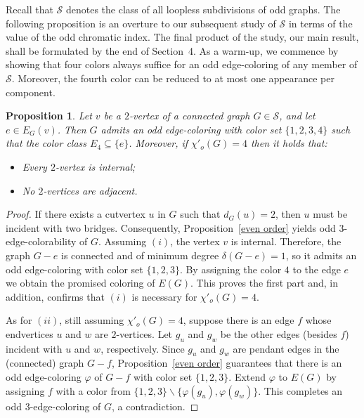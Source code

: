 \documentclass[a4paper,12pt]{article}
\newtheorem{proposition}[theorem]{Proposition}
\numberwithin{equation}{section}
\begin{document}
Recall that $\mathcal{S}$ denotes the class of all loopless subdivisions of odd graphs. The following proposition is an overture to our subsequent study of $\mathcal{S}$ in terms of the value of the odd chromatic index. The final product of the study, our main result, shall be formulated by the end of Section~4. As a warm-up, we commence by showing that four colors always suffice for an odd edge-coloring of any member of $\mathcal{S}$. Moreover, the fourth color can be reduced to at most one appearance per component.
\begin{proposition}
    \label{4-edge-colorability}
Let $v$ be a $2$-vertex of a connected graph $G\in \mathcal{S}$, and let $e\in E_G(v)$. Then $G$ admits an odd edge-coloring with color set $\{1,2,3,4\}$ such that the color class $E_4\subseteq \{e\}$. Moreover, if $\chi'_o(G)=4$ then it holds that:
 \begin{itemize}
 \item [$(i)$] Every $2$-vertex is internal;
 \item [$(ii)$] No $2$-vertices are adjacent.
 \end{itemize}
\end{proposition}
\begin{proof}
If there exists a cutvertex $u$ in $G$ such that $d_G(u)=2$, then $u$ must be incident with two bridges. Consequently, Proposition~\ref{even order} yields odd $3$-edge-colorability of $G$. Assuming $(i)$, the vertex $v$ is internal. Therefore, the graph $G-e$ is connected and of minimum degree $\delta(G-e)=1$, so it admits an odd edge-coloring with color set $\{1,2,3\}$. By assigning the color $4$ to the edge $e$ we obtain the promised coloring of $E(G)$. This proves the first part and, in addition, confirms that $(i)$ is necessary for $\chi'_o(G)=4$.

As for $(ii)$, still assuming $\chi'_o(G)=4$, suppose there is an edge $f$ whose endvertices $u$ and $w$ are $2$-vertices. Let $g_u$ and $g_w$ be the other edges (besides $f$) incident with $u$ and $w$, respectively. Since $g_u$ and $g_w$ are pendant edges in the (connected) graph $G-f$, Proposition~\ref{even order} guarantees that there is an odd edge-coloring $\varphi$ of $G-f$ with color set $\{1,2,3\}$. Extend $\varphi$ to $E(G)$ by assigning $f$ with a color from $\{1,2,3\}\backslash\{\varphi(g_u),\varphi(g_w)\}$. This completes an odd $3$-edge-coloring of $G$, a contradiction.\end{proof}
\end{document}
